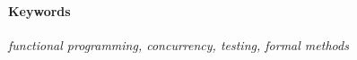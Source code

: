 
\vfill

\paragraph{Keywords}

\textit{functional programming, concurrency,
  testing, formal methods}